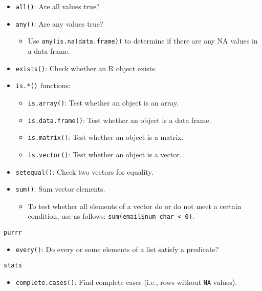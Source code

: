 \documentclass[]{book}
\providecommand{\tightlist}{%
  \setlength{\itemsep}{0pt}\setlength{\parskip}{0pt}}
\begin{document}
\begin{itemize}
\tightlist
\item
  \texttt{all()}: Are all values true?
\item
  \texttt{any()}: Are any values true?

  \begin{itemize}
  \tightlist
  \item
    Use \texttt{any(is.na(data.frame))} to determine if there are any NA values in a data frame.
  \end{itemize}
\item
  \texttt{exists()}: Check whether an R object exists.
\item
  \texttt{is.*()} functions:

  \begin{itemize}
  \tightlist
  \item
    \texttt{is.array()}: Test whether an object is an array.
  \item
    \texttt{is.data.frame()}: Test whether an object is a data frame.
  \item
    \texttt{is.matrix()}: Test whether an object is a matrix.
  \item
    \texttt{is.vector()}: Test whether an object is a vector.
  \end{itemize}
\item
  \texttt{setequal()}: Check two vectors for equality.
\item
  \texttt{sum()}: Sum vector elements.

  \begin{itemize}
  \tightlist
  \item
    To test whether all elements of a vector do or do not meet a certain condition, use as follows: \texttt{sum(email\$num\_char\ \textless{}\ 0)}.
  \end{itemize}
\end{itemize}

\texttt{purrr}

\begin{itemize}
\tightlist
\item
  \texttt{every()}: Do every or some elements of a list satisfy a predicate?
\end{itemize}

\texttt{stats}

\begin{itemize}
\tightlist
\item
  \texttt{complete.cases()}: Find complete cases (i.e., rows without \texttt{NA} values).
\end{itemize}
\end{document}
